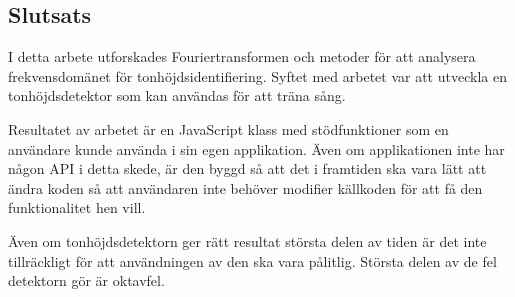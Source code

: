 \subsection*{Slutsats}
I detta arbete utforskades Fouriertransformen och metoder för att analysera frekvensdomänet för tonhöjdsidentifiering. Syftet med arbetet var att utveckla en tonhöjdsdetektor som kan användas för att träna sång.

Resultatet av arbetet är en JavaScript klass med stödfunktioner som en \linebreak användare kunde använda i sin egen applikation. Även om applikationen inte har någon API i detta skede, är den byggd så att det i framtiden ska vara lätt att ändra koden så att användaren inte behöver modifier källkoden för att få den funktionalitet hen vill. 

Även om tonhöjdsdetektorn ger rätt resultat största delen av tiden är det inte tillräckligt för att användningen av den ska vara pålitlig. Största delen av de fel detektorn gör är oktavfel.
